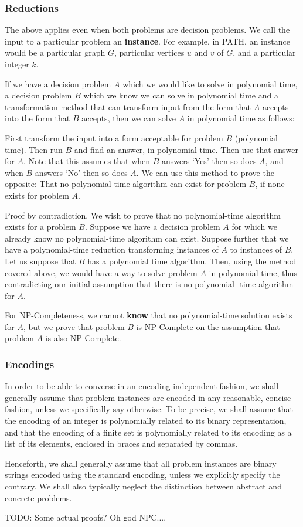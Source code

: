 \subsubsection{Reductions}
The above applies even when both problems are decision problems. We call
the input to a particular problem an \textbf{instance}. For example, in PATH,
an instance would be a particular graph $G$, particular vertices $u$ and $v$
of $G$, and a particular integer $k$.

If we have a decision problem $A$ which we would like to solve in polynomial time, a decision
problem $B$ which we know we can solve in polynomial time and a transformation method that can
transform input from the form that $A$ accepts into the form that $B$ accepts, then we can solve
$A$ in polynomial time as follows:

First transform the input into a form acceptable for problem $B$ (polynomial time). Then run $B$ and
find an answer, in polynomial time. Then use that answer for $A$. Note that this assumes that when $B$
answers `Yes' then so does $A$, and when $B$ answers `No' then so does $A$. We can use this method to prove
the opposite: That no polynomial-time algorithm can exist for problem $B$, if none exists for problem $A$.

Proof by contradiction. We wish to prove that no polynomial-time algorithm
exists for a problem $B$. Suppose we have a decision problem $A$ for which we
already know no polynomial-time algorithm can exist. Suppose further that we
have a polynomial-time reduction transforming instances of $A$ to instances of
$B$. Let us suppose that $B$ has a polynomial time algorithm. Then, using the
method covered above, we would have a way to solve problem $A$ in polynomial
time, thus contradicting our initial assumption that there is no polynomial-
time algorithm for $A$.

For NP-Completeness, we cannot \textbf{know} that no polynomial-time solution
exists for $A$, but we prove that problem $B$ is NP-Complete on the assumption
that problem $A$ is also NP-Complete.

\subsubsection{Encodings}
In order to be able to converse in an encoding-independent fashion, we shall
generally assume that problem instances are encoded in any reasonable, concise
fashion, unless we specifically say otherwise. To be precise, we shall assume
that the encoding of an integer is polynomially related to its binary
representation, and that the encoding of a finite set is polynomially related
to its encoding as a list of its elements, enclosed in braces and separated by
commas.

Henceforth, we shall generally assume that all problem instances are binary
strings encoded using the standard encoding, unless we explicitly specify the
contrary. We shall also typically neglect the distinction between abstract and
concrete problems.

TODO: Some actual proofs? Oh god NPC....
